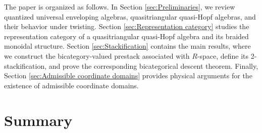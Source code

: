 \documentclass[reqno]{amsart}
\theoremstyle{definition}
\theoremstyle{remark}
\begin{document}
The paper is organized as follows. In Section \ref{sec:Preliminaries}, we review quantized universal enveloping algebras, quasitriangular quasi-Hopf algebras, and their behavior under twisting. Section \ref{sec:Representation category} studies the representation category of a quasitriangular quasi-Hopf algebra and its braided monoidal structure. Section \ref{sec:Stackification} contains the main results, where we construct the bicategory-valued prestack associated with $R$-space, define its 2-stackification, and prove the corresponding bicategorical descent theorem. Finally, Section \ref{sec:Admissible coordinate domains} provides physical arguments for the existence of admissible coordinate domains.


    

\section*{Summary}
\end{document}
